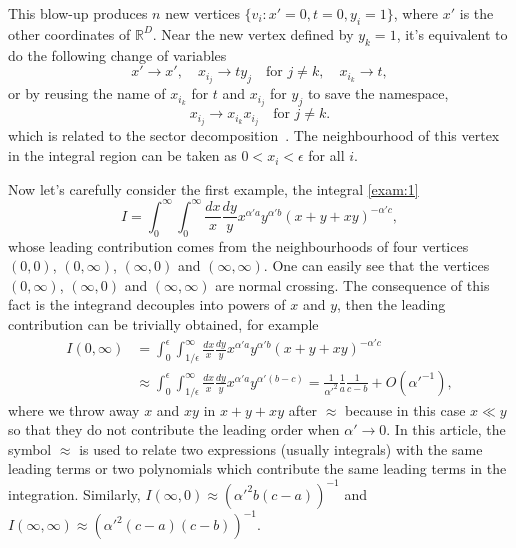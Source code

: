 \documentclass[12pt]{article}
\theoremstyle{definition}
\theoremstyle{plain}
\begin{document}
This blow-up produces $n$ new vertices 
$
	\{v_i:x'=0,t=0,y_i=1\}
$, where $x'$ is the other coordinates of $\mathbb R^D$.
Near the new vertex defined by $y_k=1$, it's equivalent to do 
the following change of variables
\[
	x'\to x',\quad x_{i_j}\to ty_j\quad \text{for $j\neq k$},\quad x_{i_k}\to t,
\]
or by reusing the name of $x_{i_k}$ for $t$ and $x_{i_j}$ 
for $y_j$ to save the namespace,
\begin{equation}\label{sec_doc}
	x_{i_j}\to x_{i_k}x_{i_j}\quad \text{for $j\neq k$}.
\end{equation}
which is related to the sector decomposition~\cite{Heinrich:2008si}. 
The neighbourhood of this vertex in the integral region 
can be taken as $0<x_i<\epsilon$ for all $i$.

Now let's carefully consider the first example, the integral \eqref{exam:1}
\[
	I=\int_0^\infty \int_0^\infty\frac{dx}{x}\frac{dy}{y}x^{\alpha' a}y^{\alpha' b}(x+y+x y)^{-\alpha' c},
\]
whose leading contribution comes from the neighbourhoods of four vertices $(0,0)$, $(0,\infty)$, $(\infty,0)$ and $(\infty,\infty)$. One can easily see that the vertices $(0,\infty)$, $(\infty,0)$ and $(\infty,\infty)$ are normal crossing. The consequence of this fact is the integrand decouples into powers of $x$ and $y$, then the leading contribution can be trivially obtained, for example 
\begin{align*}
	I(0,\infty)&=\int_{0}^\epsilon\int_{1/\epsilon}^\infty \frac{dx}{x}\frac{dy}{y}x^{\alpha' a}y^{\alpha' b}(x+y+xy)^{-\alpha' c} \\
	&\approx \int_{0}^\epsilon\int_{1/\epsilon}^\infty \frac{dx}{x}\frac{dy}{y}x^{\alpha' a}y^{\alpha' (b-c)}= 
	\frac{1}{{\alpha'}^2}\frac{1}{a} \frac{1}{c-b}+O({\alpha'}^{-1}),
\end{align*}
where we throw away $x$ and $xy$ in $x+y+xy$ after $\approx$ because in this case $x\ll y$
so that they do not contribute the leading order when $\alpha' \to 0$.
In this article, the symbol $\approx$ is used to relate two expressions 
(usually integrals) with the same leading terms 
or two polynomials which contribute the same leading terms in the integration.
Similarly, $I(\infty,0)\approx ({\alpha'}^2 b (c-a))^{-1}$ and $I(\infty,\infty)\approx (\alpha'^{2}(c-a) (c-b))^{-1}.$
\end{document}
